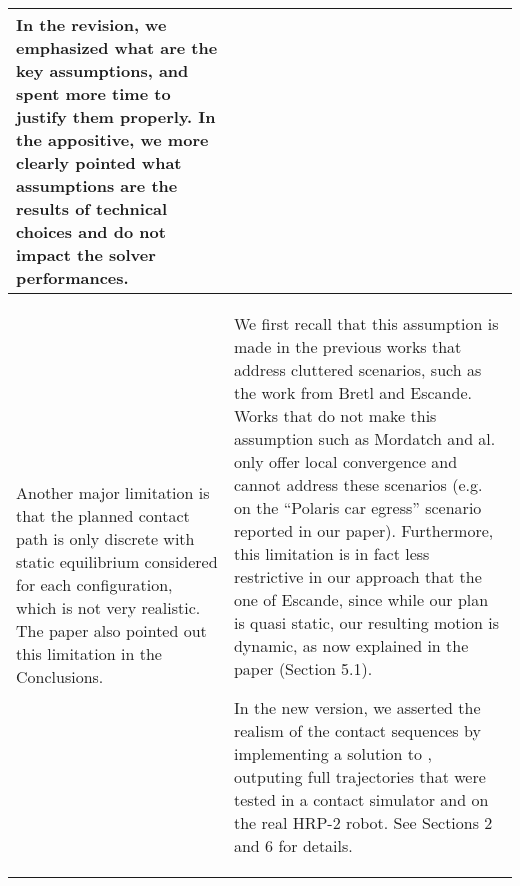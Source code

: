 \documentclass[a4paper]{article}
\begin{document}
\begin{longtable}{|p{21em}|p{21em}|}
In the revision, we emphasized what are the key assumptions, and spent more time to justify them properly.
In the appositive, we more clearly pointed what assumptions are the results of technical choices and do not impact the solver performances.


\\ \hline %
Another major limitation is that the planned contact path is only discrete with static equilibrium considered for each configuration, which is not very realistic. The paper also pointed out this limitation in the Conclusions.
&
We first recall that this assumption is made in the previous works that address cluttered scenarios, such as the work from Bretl and Escande. Works that do not make this assumption such as Mordatch and al. only offer local convergence and cannot address these scenarios (e.g. on the ``Polaris car egress'' scenario reported in our paper). Furthermore, this limitation is in fact less restrictive in our approach that the one of Escande, since while our plan is quasi static, our resulting motion is dynamic, as now explained in the paper (Section 5.1). 

In the new version, we asserted the realism of the contact sequences by implementing a solution to \mP3, outputing full trajectories that were tested in a contact simulator and on the real HRP-2 robot.
See Sections 2 and 6 for details.


\end{longtable}
\end{document}
